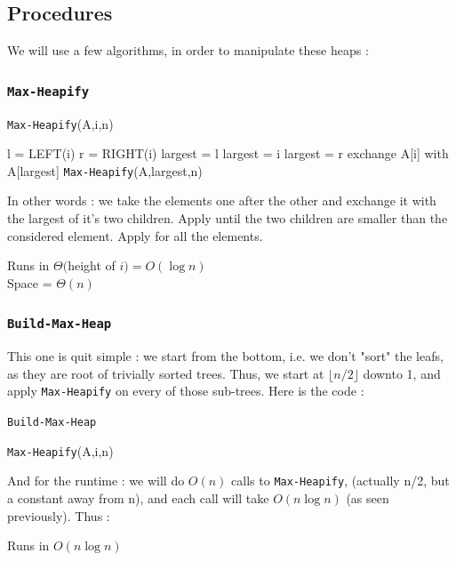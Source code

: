 \documentclass[12pt,twoside,a4paper]{article}
\begin{document}
\subsection{Procedures}
We will use a few algorithms, in order to manipulate these heaps :
\subsubsection{\texttt{Max-Heapify}}
\begin{algorithm}
	\caption{\texttt{Max-Heapify}(A,i,n)}
	\begin{algorithmic}
		\STATE l = LEFT(i)
		\STATE r = RIGHT(i)
			\STATE largest = l
		\ELSE
			\STATE largest = i
		\ENDIF
			\STATE largest = r
		\ENDIF
			\STATE exchange A[i] with A[largest]
			\STATE \texttt{Max-Heapify}(A,largest,n)
		\ENDIF
	\end{algorithmic}
\end{algorithm}
In other words : we take the elements one after the other and exchange it with the largest of it's two children. Apply until the two children are smaller than the considered element. Apply for all the elements.
\begin{boite}[0.5]
	\centering
	Runs in $\Theta($height of $i) = O(\log n)$\\
	Space = $\Theta(n)$
\end{boite}
\subsubsection{\texttt{Build-Max-Heap}}
This one is quit simple : we start from the bottom, i.e. we don't "sort" the leafs, as they are root of trivially sorted trees. Thus, we start at $\lfloor n/2 \rfloor$ downto 1, and apply \texttt{Max-Heapify} on every of those sub-trees. Here is the code :
\begin{algorithm}
	\caption{\texttt{Build-Max-Heap}}
	\begin{algorithmic}
		\FOR{$i = \lfloor n/2 \rfloor$ \textbf{downto} 1}
			\STATE \texttt{Max-Heapify}(A,i,n)
		\ENDFOR
	\end{algorithmic}
\end{algorithm}
And for the runtime : we will do $O(n)$ calls to \texttt{Max-Heapify}, (actually n/2, but a constant away from n), and each call will take $O(n\log n)$ (as seen previously). Thus :
\begin{boite}[0.4]
	\centering
	Runs in $O(n\log n)$
\end{boite}
\end{document}
